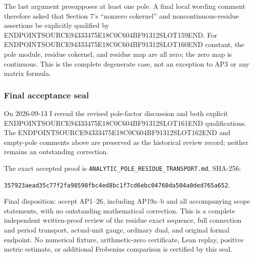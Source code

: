 The last argument presupposes at least one pole. A final local wording comment therefore asked that Section 7's ``nonzero cokernel'' and noncontinuous-residue assertions be explicitly qualified by ENDPOINTSOURCE94333475E18C0C604BF91312SLOT159END. For ENDPOINTSOURCE94333475E18C0C604BF91312SLOT160END constant, the pole module, residue cokernel, and residue map are all zero; the zero map is continuous. This is the complete degenerate case, not an exception to AP3 or any matrix formula.

\subsubsection{Final acceptance seal}\label{endpoint-analytic_pole_review--final-acceptance-seal}

On 2026-09-13 I reread the revised pole-factor discussion and both explicit ENDPOINTSOURCE94333475E18C0C604BF91312SLOT161END qualifications. The ENDPOINTSOURCE94333475E18C0C604BF91312SLOT162END and empty-pole comments above are preserved as the historical review record; neither remains an outstanding correction.

The exact accepted proof is \texttt{ANALYTIC\_POLE\_RESIDUE\_TRANSPORT.md}, SHA-256:

\texttt{357923aead35c77f2fa98598fbc4ed8bc1f7cd6ebc04760da504a0ded765a652}.

Final disposition: accept AP1--26, including AP19a--b and all accompanying scope statements, with no outstanding mathematical correction. This is a complete independent written-proof review of the residue exact sequence, full connection and period transport, actual-unit gauge, ordinary dual, and original formal endpoint. No numerical fixture, arithmetic-zero certificate, Lean replay, positive metric estimate, or additional Frobenius comparison is certified by this seal.
